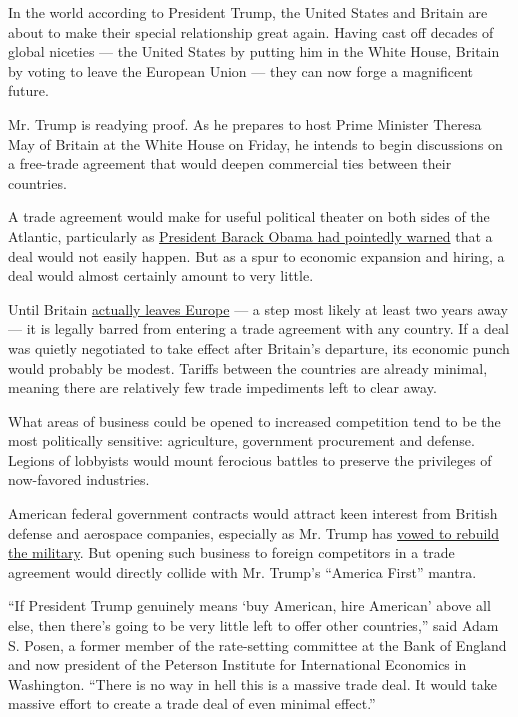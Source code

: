 In the world according to President Trump, the United States and Britain
are about to make their special relationship great again. Having cast
off decades of global niceties --- the United States by putting him in
the White House, Britain by voting to leave the European Union --- they
can now forge a magnificent future.

Mr. Trump is readying proof. As he prepares to host Prime Minister
Theresa May of Britain at the White House on Friday, he intends to begin
discussions on a free-trade agreement that would deepen commercial ties
between their countries.

A trade agreement would make for useful political theater on both sides
of the Atlantic, particularly as
\href{https://www.nytimes.com/2016/04/23/world/europe/obama-britain-visit.html}{President
Barack Obama had pointedly warned} that a deal would not easily happen.
But as a spur to economic expansion and hiring, a deal would almost
certainly amount to very little.

Until Britain
\href{https://www.nytimes.com/2017/01/24/world/europe/theresa-may-brexit-vote-article-50.html}{actually
leaves Europe} --- a step most likely at least two years away --- it is
legally barred from entering a trade agreement with any country. If a
deal was quietly negotiated to take effect after Britain's departure,
its economic punch would probably be modest. Tariffs between the
countries are already minimal, meaning there are relatively few trade
impediments left to clear away.

What areas of business could be opened to increased competition tend to
be the most politically sensitive: agriculture, government procurement
and defense. Legions of lobbyists would mount ferocious battles to
preserve the privileges of now-favored industries.

American federal government contracts would attract keen interest from
British defense and aerospace companies, especially as Mr. Trump has
\href{https://www.nytimes.com/2016/09/08/us/politics/donald-trump-speech.html}{vowed
to rebuild the military}. But opening such business to foreign
competitors in a trade agreement would directly collide with Mr. Trump's
``America First'' mantra.

``If President Trump genuinely means `buy American, hire American' above
all else, then there's going to be very little left to offer other
countries,'' said Adam S. Posen, a former member of the rate-setting
committee at the Bank of England and now president of the Peterson
Institute for International Economics in Washington. ``There is no way
in hell this is a massive trade deal. It would take massive effort to
create a trade deal of even minimal effect.''

